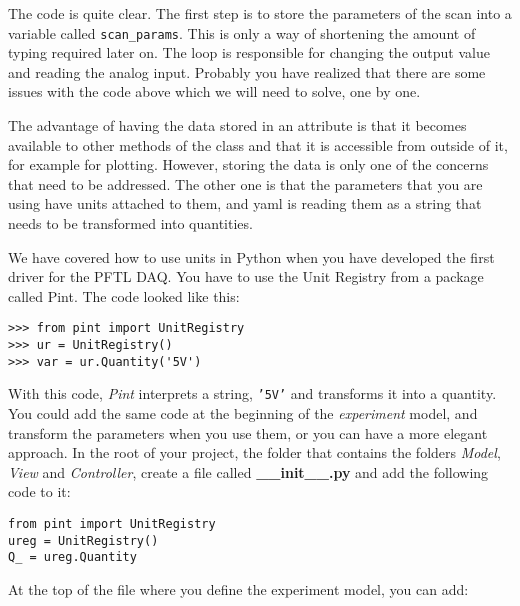 {The code is quite clear. The first step is to store the parameters of the scan into a variable called \texttt{scan_params}. This is only a way of shortening the amount of typing required later on. The loop is responsible for changing the output value and reading the analog input. Probably you have realized that there are some issues with the code above which we will need to solve, one by one.


The advantage of having the data stored in an attribute is that it becomes available to other methods of the class and that it is accessible from outside of it, for example for plotting. However,
storing the data is only one of the concerns that need to be addressed. The other one is that the parameters that you are using have units attached to them, and yaml is reading them as a string that needs to be
transformed into quantities.

We have covered how to use units in Python when you have developed the first driver for the {PFTL} {DAQ}. You have to use the Unit Registry from a package called Pint. The code looked like this:

\begin{verbatim}
>>> from pint import UnitRegistry
>>> ur = UnitRegistry()
>>> var = ur.Quantity('5V')
\end{verbatim}

With this code, \emph{Pint} interprets a string, \texttt{'5V'} and transforms it into a quantity. You could add the same code at the beginning of the \emph{experiment} model, and transform the parameters when you use them, or you can have a more elegant approach. In the root of your project, the folder that contains the folders \emph{Model}, \emph{View} and \emph{Controller}, create a file called \textbf{\_\_init\_\_.py} and add the following code to it:

\begin{verbatim}
from pint import UnitRegistry
ureg = UnitRegistry()
Q_ = ureg.Quantity
\end{verbatim}

At the top of the file where you define the experiment model, you can add:

}
